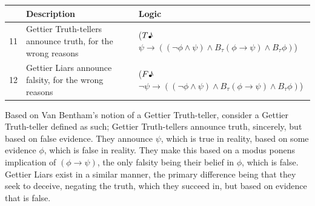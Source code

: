 \documentclass[12pt, titlepage, twoside, a4paper]{report}
\newcommand{\true}{$T\text{\textmusicalnote}$}
\newcommand{\false}{$F\text{\textmusicalnote}$}
\begin{document}
{\begin{table}[h]
\begin{tabular}{lp{6cm}p{8cm}}
\hline
   & Description                                                 & Logic                                                                                                           \\ \hline
11 & Gettier Truth-tellers announce truth, for the wrong reasons & (\true$\psi \to ((\neg \phi \wedge \psi ) \wedge B_\tau (\phi \to \psi ) \wedge B_\tau \phi)$)       \\
12 & Gettier Liars announce falsity, for the wrong reasons       & (\false$\neg \psi \to ((\neg \phi \wedge \psi ) \wedge B_\tau (\phi \to \psi ) \wedge B_\tau \phi)$) \\ \hline
\end{tabular}
\end{table}
Based on Van Bentham's notion of a Gettier Truth-teller\autocite{BenthemJohanvan2010Mlfo}, consider a Gettier Truth-teller defined as such; Gettier Truth-tellers announce truth, sincerely, but based on false evidence. They announce $\psi$, which is true in reality, based on some evidence $\phi$, which is false in reality. They make this based on a modus ponens implication of $(\phi \to \psi)$, the only falsity being their belief in $\phi$, which is false.\\
Gettier Liars exist in a similar manner, the primary difference being that they seek to deceive, negating the truth, which they succeed in, but based on evidence that is false.

}
\end{document}
